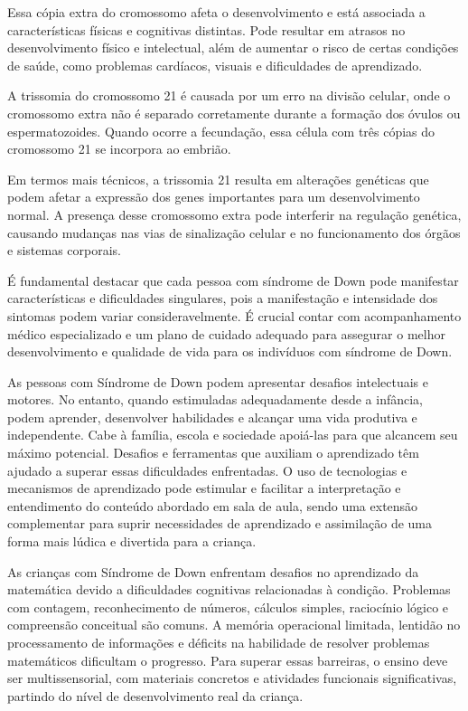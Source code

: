 Essa cópia extra do cromossomo afeta o desenvolvimento e está associada a características físicas e cognitivas distintas. Pode resultar em atrasos no desenvolvimento físico e intelectual, além de aumentar o risco de certas condições de saúde, como problemas cardíacos, visuais e dificuldades de aprendizado.

A trissomia do cromossomo 21 é causada por um erro na divisão celular, onde o cromossomo extra não é separado corretamente durante a formação dos óvulos ou espermatozoides. Quando ocorre a fecundação, essa célula com três cópias do cromossomo 21 se incorpora ao embrião.

Em termos mais técnicos, a trissomia 21 resulta em alterações genéticas que podem afetar a expressão dos genes importantes para um desenvolvimento normal. A presença desse cromossomo extra pode interferir na regulação genética, causando mudanças nas vias de sinalização celular e no funcionamento dos órgãos e sistemas corporais.

É fundamental destacar que cada pessoa com síndrome de Down pode manifestar características e dificuldades singulares, pois a manifestação e intensidade dos sintomas podem variar consideravelmente. É crucial contar com acompanhamento médico especializado e um plano de cuidado adequado para assegurar o melhor desenvolvimento e qualidade de vida para os indivíduos com síndrome de Down.

As pessoas com Síndrome de Down podem apresentar desafios intelectuais e motores. No entanto, quando estimuladas adequadamente desde a infância, podem aprender, desenvolver habilidades e alcançar uma vida produtiva e independente. Cabe à família, escola e sociedade apoiá-las para que alcancem seu máximo potencial. Desafios e ferramentas que auxiliam o aprendizado têm ajudado a superar essas dificuldades enfrentadas. O uso de tecnologias e mecanismos de aprendizado pode estimular e facilitar a interpretação e entendimento do conteúdo abordado em sala de aula, sendo uma extensão complementar para suprir necessidades de aprendizado e assimilação de uma forma mais lúdica e divertida para a criança.

As crianças com Síndrome de Down enfrentam desafios no aprendizado da matemática devido a dificuldades cognitivas relacionadas à condição. Problemas com contagem, reconhecimento de números, cálculos simples, raciocínio lógico e compreensão conceitual são comuns. A memória operacional limitada, lentidão no processamento de informações e déficits na habilidade de resolver problemas matemáticos dificultam o progresso. Para superar essas barreiras, o ensino deve ser multissensorial, com materiais concretos e atividades funcionais significativas, partindo do nível de desenvolvimento real da criança.

